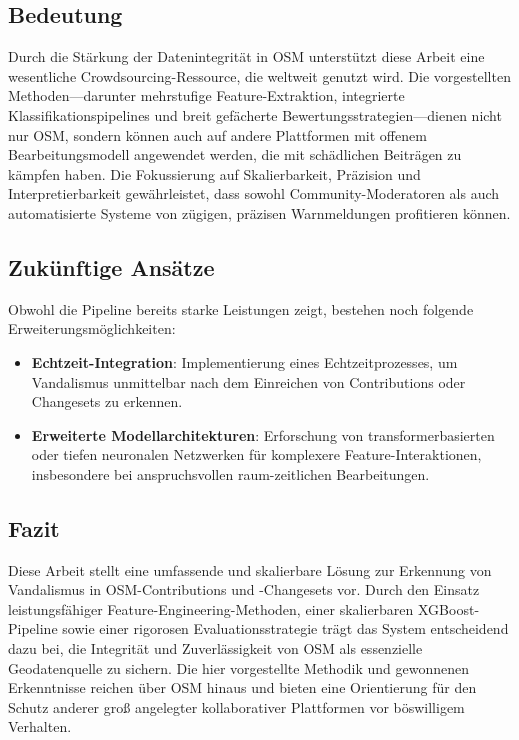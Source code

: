 \documentclass[
    13pt, %
    a4paper, %
    listof=totoc, %
    bibliography=totoc, %
    index=totoc, %
    headsepline
]{scrreprt}
\begin{document}
\subsection*{Bedeutung}
\noindent
Durch die Stärkung der Datenintegrität in OSM unterstützt diese Arbeit eine wesentliche Crowdsourcing-Ressource, die weltweit genutzt wird. Die vorgestellten Methoden—darunter mehrstufige Feature-Extraktion, integrierte Klassifikationspipelines und breit gefächerte Bewertungsstrategien—dienen nicht nur OSM, sondern können auch auf andere Plattformen mit offenem Bearbeitungsmodell angewendet werden, die mit schädlichen Beiträgen zu kämpfen haben. Die Fokussierung auf Skalierbarkeit, Präzision und Interpretierbarkeit gewährleistet, dass sowohl Community-Moderatoren als auch automatisierte Systeme von zügigen, präzisen Warnmeldungen profitieren können.

\subsection*{Zukünftige Ansätze}
\noindent
Obwohl die Pipeline bereits starke Leistungen zeigt, bestehen noch folgende Erweiterungsmöglichkeiten:
\begin{itemize}
  \item \textbf{Echtzeit-Integration}: Implementierung eines Echtzeitprozesses, um Vandalismus unmittelbar nach dem Einreichen von Contributions oder Changesets zu erkennen.
  \item \textbf{Erweiterte Modellarchitekturen}: Erforschung von transformerbasierten oder tiefen neuronalen Netzwerken für komplexere Feature-Interaktionen, insbesondere bei anspruchsvollen raum-zeitlichen Bearbeitungen.
\end{itemize}

\subsection*{Fazit}
\noindent
Diese Arbeit stellt eine umfassende und skalierbare Lösung zur Erkennung von Vandalismus in OSM-Contributions und -Changesets vor. Durch den Einsatz leistungsfähiger Feature-Engineering-Methoden, einer skalierbaren XGBoost-Pipeline sowie einer rigorosen Evaluationsstrategie trägt das System entscheidend dazu bei, die Integrität und Zuverlässigkeit von OSM als essenzielle Geodatenquelle zu sichern. Die hier vorgestellte Methodik und gewonnenen Erkenntnisse reichen über OSM hinaus und bieten eine Orientierung für den Schutz anderer groß angelegter kollaborativer Plattformen vor böswilligem Verhalten.
\end{document}
